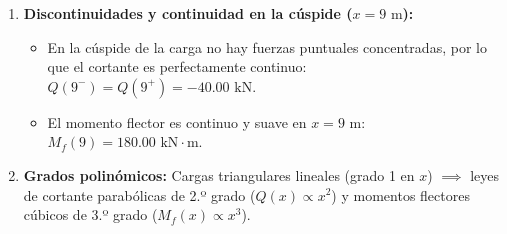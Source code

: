 {\begin{enumerate}
\begin{itemize}
                  \item Al tratarse de apoyos simples articulados en ambos extremos sin pares aplicados, $M_f(0) = 0$ y $M_f(12) = 0$.

              \end{itemize}

        \item \textbf{Discontinuidades y continuidad en la cúspide ($x = 9\text{ m}$):}

              \begin{itemize}

                  \item En la cúspide de la carga no hay fuerzas puntuales concentradas, por lo que el cortante es perfectamente continuo: $Q(9^-) = Q(9^+) = -40.00\text{ kN}$.

                  \item El momento flector es continuo y suave en $x = 9\text{ m}$: $M_f(9) = 180.00\text{ kN}\cdot\text{m}$.

              \end{itemize}

        \item \textbf{Grados polinómicos:} Cargas triangulares lineales (grado 1 en $x$) $\implies$ leyes de cortante parabólicas de 2.º grado ($Q(x) \propto x^2$) y momentos flectores cúbicos de 3.º grado ($M_f(x) \propto x^3$).

    \end{enumerate}

}







